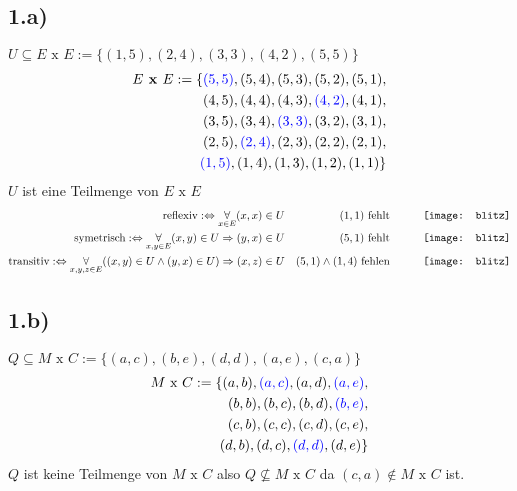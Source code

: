 \documentclass[10pt,ngerman]{scrartcl}
\begin{document}
\subsection{1.a)}
$U \subseteq E\text{ x }E := \{(1, 5), (2, 4), (3, 3), (4, 2), (5, 5)\}$
\begin{align*}
E\textbf{ x }E := \{\color{blue}(5,5)\color{black},(5,4),(5,3),(5,2),(5,1),\\
(4,5),(4,4),(4,3),\color{blue}(4,2)\color{black},(4,1),\\
(3,5),(3,4),\color{blue}(3,3)\color{black},(3,2),(3,1),\\
(2,5),\color{blue}(2,4)\color{black},(2,3),(2,2),(2,1),\\
\color{blue}(1,5)\color{black},(1,4),(1,3),(1,2),(1,1)\}
\end{align*}
$U$ ist eine Teilmenge von $E\text{ x }E$
\begin{align*}
\text{reflexiv}: \Leftrightarrow \underset{x \in E}{\forall} (x,x) \in U && (1,1) \text{ fehlt}&& \qquad \vcenter{\hbox{\texttt{[image: blitz]}}}\\
\text{symetrisch}: \Leftrightarrow \underset{x,y \in E}{\forall} (x,y) \in U \Rightarrow (y,x) \in U && (5,1) \text{ fehlt}&& \qquad \vcenter{\hbox{\texttt{[image: blitz]}}}\\
\text{transitiv}: \Leftrightarrow \underset{x,y,z \in E}{\forall} ((x,y) \in U \wedge (y,x) \in U) \Rightarrow (x,z) \in U && (5,1) \wedge (1,4)\text{ fehlen}&& \qquad \vcenter{\hbox{\texttt{[image: blitz]}}}
\end{align*}
\subsection{1.b)}
$Q \subseteq M\text{ x }C := \{(a,c),(b,e),(d,d),(a,e),(c,a)\}$
\begin{align*}
 M\text{ x }C := \{(a,b),\color{blue}(a,c)\color{black},(a,d),\color{blue}(a,e)\color{black},\\
 (b,b),(b,c),(b,d),\color{blue}(b,e)\color{black},\\
 (c,b),(c,c),(c,d),(c,e),\\
 (d,b),(d,c),\color{blue}(d,d)\color{black},(d,e)\}
\end{align*}
$Q$ ist keine Teilmenge von $M\text{ x }C$ also $Q \not\subseteq M\text{ x }C$ da $ (c,a) \notin M\text{ x }C$ ist.
\pagebreak
\end{document}

